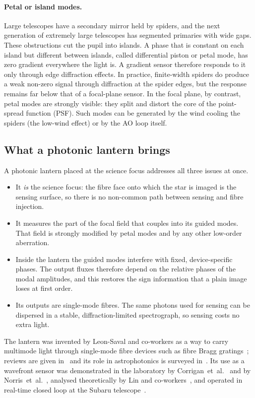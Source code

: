 \documentclass[11pt,a4paper]{article}
\begin{document}
\paragraph{Petal or island modes.} Large telescopes have a secondary mirror held by spiders, and the next generation of extremely large telescopes has segmented primaries with wide gaps. These obstructions cut the pupil into islands. A phase that is constant on each island but different between islands, called differential piston or petal mode, has zero gradient everywhere the light is. A gradient sensor therefore responds to it only through edge diffraction effects. In practice, finite-width spiders do produce a weak non-zero signal through diffraction at the spider edges, but the response remains far below that of a focal-plane sensor. In the focal plane, by contrast, petal modes are strongly visible: they split and distort the core of the point-spread function (PSF). Such modes can be generated by the wind cooling the spiders (the low-wind effect) or by the AO loop itself.

\subsection{What a photonic lantern brings}
A photonic lantern placed at the science focus addresses all three issues at once.
\begin{itemize}
\item It \emph{is} the science focus: the fibre face onto which the star is imaged is the sensing surface, so there is no non-common path between sensing and fibre injection.
\item It measures the part of the focal field that couples into its guided modes. That field is strongly modified by petal modes and by any other low-order aberration.
\item Inside the lantern the guided modes interfere with fixed, device-specific phases. The output fluxes therefore depend on the relative phases of the modal amplitudes, and this restores the sign information that a plain image loses at first order.
\item Its outputs are single-mode fibres. The same photons used for sensing can be dispersed in a stable, diffraction-limited spectrograph, so sensing costs no extra light.
\end{itemize}

The lantern was invented by Leon-Saval and co-workers as a way to carry multimode light through single-mode fibre devices such as fibre Bragg gratings~\cite{LeonSaval2005}; reviews are given in~\cite{LeonSaval2013,Birks2015} and its role in astrophotonics is surveyed in~\cite{Jovanovic2023}. Its use as a wavefront sensor was demonstrated in the laboratory by Corrigan~et~al.~\cite{Corrigan2018} and by Norris~et~al.~\cite{Norris2020}, analysed theoretically by Lin and co-workers~\cite{Lin2022,Lin2023}, and operated in real-time closed loop at the Subaru telescope~\cite{Lin2023PRL,Lin2025}.
\end{document}
